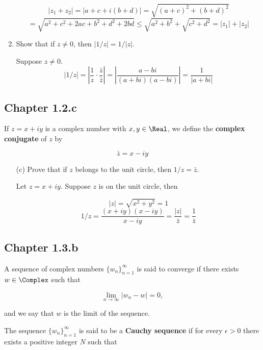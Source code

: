 \begin{enumerate}[label=(\alph*)]
        $$
        |z_1 + z_2| = |a+c + i(b+d)| = \sqrt{(a+c)^2 + (b+d)^2}
        $$
        $$
        =
        \sqrt{a^2+c^2+2ac + b^2 + d^2 + 2bd}
        \leq
        \sqrt{a^2+b^2} + \sqrt{c^2+d^2}
        =|z_1| + |z_2|
        $$

    \item Show that if $z\neq 0$, then $|1/z| = 1/|z|$.

        Suppose $z\neq 0$.
        $$
    |1/z| = \left|\frac{1}{z}\cdot\frac{\bar{z}}{\bar{z}}\right|
    =\left|
    \frac{a-bi}{(a+bi)(a-bi)}\right|=\frac{1}{|a+bi|}
        $$

\end{enumerate}

\newpage

\subsection{Chapter 1.2.c}

If $z=x+iy$ is a complex number with $x,y\in\Real$, we define the \textbf{complex conjugate}
of $z$ by

$$
\bar{z} = x-iy
$$

\begin{enumerate}[label=(\alph*)]

    \item[(c)] Prove that if $z$ belongs to the unit circle, then $1/z=\bar{z}$.

        Let $z=x+iy$. Suppose $z$ is on the unit circle, then

        $$
        |z| = \sqrt{x^2+y^2} = 1 
        $$
        $$
        1/z = \frac{(x+iy)(x-iy)}{x-iy}
        =\frac{|z|}{\bar{z}} = \frac{1}{\bar{z}}
        $$

\end{enumerate}

\subsection{Chapter 1.3.b}

A sequence of complex numbers $\lbrace w_n\rbrace^\infty_{n=1}$ is said to converge if
there exists $w\in\Complex$ such that

$$
\lim_{n\rightarrow\infty}|w_n-w| = 0,
$$

and we say that $w$ is the limit of the sequence.

The sequence $\lbrace w_n\rbrace^\infty_{n=1}$ is said to be a \textbf{Cauchy sequence}
if for every $\epsilon >0$ there exists a positive integer $N$ such that

